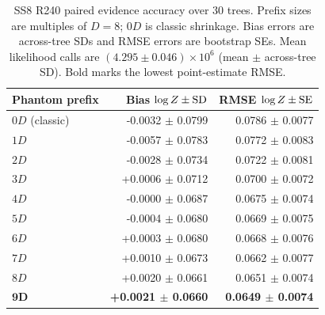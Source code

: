 \begin{table}[t]
\caption{SS8 R240 paired evidence accuracy over 30 trees. Prefix sizes are multiples of $D=8$; $0D$ is classic shrinkage. Bias errors are across-tree SDs and RMSE errors are bootstrap SEs. Mean likelihood calls are $(4.295\pm0.046)\times10^6$ (mean $\pm$ across-tree SD). Bold marks the lowest point-estimate RMSE.}
\label{tab:phantom_evidence_ss8}
\centering
\scriptsize
\begin{tabular}{lrr}
\toprule
Phantom prefix & Bias $\log Z\mathbin{\pm}{\rm SD}$ & RMSE $\log Z\mathbin{\pm}{\rm SE}$ \\
\midrule
$0D$ (classic) & -0.0032 $\pm$ 0.0799 & 0.0786 $\pm$ 0.0077 \\
$1D$ & -0.0057 $\pm$ 0.0783 & 0.0772 $\pm$ 0.0083 \\
$2D$ & -0.0028 $\pm$ 0.0734 & 0.0722 $\pm$ 0.0081 \\
$3D$ & +0.0006 $\pm$ 0.0712 & 0.0700 $\pm$ 0.0072 \\
$4D$ & -0.0000 $\pm$ 0.0687 & 0.0675 $\pm$ 0.0074 \\
$5D$ & -0.0004 $\pm$ 0.0680 & 0.0669 $\pm$ 0.0075 \\
$6D$ & +0.0003 $\pm$ 0.0680 & 0.0668 $\pm$ 0.0076 \\
$7D$ & +0.0010 $\pm$ 0.0673 & 0.0662 $\pm$ 0.0077 \\
$8D$ & +0.0020 $\pm$ 0.0661 & 0.0651 $\pm$ 0.0074 \\
$\boldsymbol{9D}$ & \textbf{+0.0021 $\pm$ 0.0660} & \textbf{0.0649 $\pm$ 0.0074} \\
\bottomrule
\end{tabular}
\end{table}


